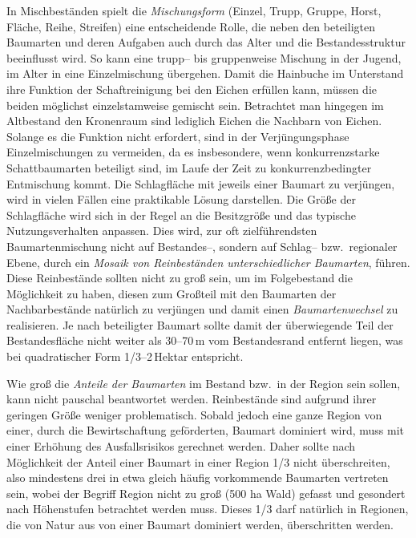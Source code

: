 \documentclass[twocolumn]{scrartcl}
\begin{document}
In Mischbeständen spielt die \emph{Mischungsform} (Einzel, Trupp,
Gruppe, Horst, Fläche, Reihe, Streifen) eine entscheidende Rolle, die
neben den beteiligten Baumarten und deren Aufgaben auch durch das
Alter und die Bestandesstruktur beeinflusst wird. So kann eine trupp--
bis gruppenweise Mischung in der Jugend, im Alter in eine
Einzelmischung übergehen. Damit die Hainbuche im Unterstand ihre
Funktion der Schaftreinigung bei den Eichen erfüllen kann, müssen
die beiden möglichst einzelstamweise gemischt sein. Betrachtet man
hingegen im Altbestand den Kronenraum sind lediglich Eichen die
Nachbarn von Eichen. Solange es die Funktion nicht erfordert, sind in
der Verjüngungsphase Einzelmischungen zu vermeiden, da es insbesondere, wenn konkurrenzstarke Schattbaumarten beteiligt sind, im Laufe der Zeit
zu konkurrenzbedingter Entmischung kommt. Die Schlagfläche mit jeweils
einer Baumart zu verjüngen, wird in vielen Fällen eine praktikable
Lösung darstellen. Die Größe der Schlagfläche wird sich in der Regel
an die Besitzgröße und das typische Nutzungsverhalten anpassen. Dies
wird, zur oft zielführendsten Baumartenmischung nicht auf Bestandes--,
sondern auf Schlag-- bzw.\ regionaler Ebene, durch ein \emph{Mosaik von Reinbeständen
unterschiedlicher Baumarten}, führen. Diese Reinbestände sollten
nicht zu groß sein, um im Folgebestand die Möglichkeit zu haben,
diesen zum Großteil mit den Baumarten der Nachbarbestände natürlich zu
verjüngen und damit einen \emph{Baumartenwechsel} zu realisieren. Je
nach beteiligter Baumart sollte damit der überwiegende Teil der
Bestandesfläche nicht weiter als 30--70\,m vom Bestandesrand entfernt
liegen, was bei quadratischer Form 1/3--2\,Hektar entspricht.

Wie groß die \emph{Anteile der Baumarten} im Bestand bzw.\ in der
Region sein sollen, kann nicht pauschal beantwortet
werden. Reinbestände sind aufgrund ihrer geringen Größe weniger
problematisch. Sobald jedoch eine ganze Region von einer, durch die
Bewirtschaftung geförderten, Baumart dominiert wird, muss mit einer
Erhöhung des Ausfallsrisikos gerechnet werden. Daher sollte nach
Möglichkeit der Anteil einer Baumart in einer Region 1/3 nicht
überschreiten, also mindestens drei in etwa gleich häufig vorkommende
Baumarten vertreten sein, wobei der Begriff Region nicht zu groß (500
ha Wald) gefasst und gesondert nach Höhenstufen betrachtet werden
muss. Dieses 1/3 darf natürlich in Regionen, die von Natur aus von
einer Baumart dominiert werden, überschritten werden.
\end{document}
